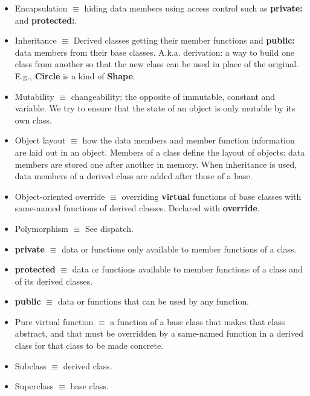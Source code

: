 \documentclass[12pt]{article}
\begin{document}
\begin{itemize}
\item Encapsulation $\equiv$ hiding data members using access control such as \textbf{private:} and \textbf{protected:}.

\item Inheritance $\equiv$ Derived classes getting their member functions and \textbf{public:} data members from their base classes. A.k.a. derivation: a way to build one class from another so that the new class can be used in place of the original. E.g., \textbf{Circle} is a kind of \textbf{Shape}.

\item Mutability $\equiv$ changeability; the opposite of immutable, constant and variable. We try to ensure that the state of an object is only mutable by its own class.

\item Object layout $\equiv$ how the data members and member function information are laid out in an object. Members of a class define the layout of objects: data members are stored one after another in memory. When inheritance is used, data members of a derived class are added after those of a base.

\item Object-oriented override $\equiv$ overriding \textbf{virtual} functions of base classes with same-named functions of derived classes. Declared with \textbf{override}.

\item Polymorphism $\equiv$ See dispatch.

\item \textbf{private} $\equiv$ data or functions only available to member functions of a class.

\item \textbf{protected} $\equiv$ data or functions available to member functions of a class and of its derived classes.

\item \textbf{public} $\equiv$ data or functions that can be used by any function.

\item Pure virtual function $\equiv$ a function of a base class that makes that class abstract, and that must be overridden by a same-named function in a derived class for that class to be made concrete.

\item Subclass $\equiv$ derived class.

\item Superclass $\equiv$ base class.


\end{itemize}
\end{document}
